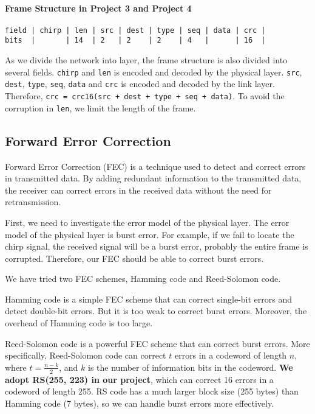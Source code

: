 \documentclass{article}
\begin{document}
\paragraph{Frame Structure in Project 3 and Project 4}
\begin{verbatim}
field | chirp | len | src | dest | type | seq | data | crc |
bits  |       | 14  | 2   | 2    | 2    | 4   |      | 16  |
\end{verbatim}

As we divide the network into layer, the frame structure is also divided into several fields. \texttt{chirp} and \texttt{len} is encoded and decoded by the physical layer. \texttt{src}, \texttt{dest}, \texttt{type}, \texttt{seq}, \texttt{data} and \texttt{crc} is encoded and decoded by the link layer.
Therefore, \texttt{crc = crc16(src + dest + type + seq + data)}.
To avoid the corruption in \texttt{len}, we limit the length of the frame.

\subsection{Forward Error Correction}

Forward Error Correction (FEC) is a technique used to detect and correct errors in transmitted data.
By adding redundant information to the transmitted data, the receiver can correct errors in the received data without the need for retransmission.

First, we need to investigate the error model of the physical layer.
The error model of the physical layer is burst error.
For example, if we fail to locate the chirp signal, the received signal will be a burst error, probably the entire frame is corrupted.
Therefore, our FEC should be able to correct burst errors.

We have tried two FEC schemes, Hamming code and Reed-Solomon code.

Hamming code is a simple FEC scheme that can correct single-bit errors and detect double-bit errors. But it is too weak to correct burst errors. Moreover, the overhead of Hamming code is too large.

Reed-Solomon code is a powerful FEC scheme that can correct burst errors.
More specifically, Reed-Solomon code can correct \(t\) errors in a codeword of length \(n\), where \(t = \frac{n-k}{2}\), and \(k\) is the number of information bits in the codeword.
\textbf{We adopt RS(255, 223) in our project}, which can correct 16 errors in a codeword of length 255.
RS code has a much larger block size (255 bytes) than Hamming code (7 bytes), so we can handle burst errors more effectively.
\end{document}
